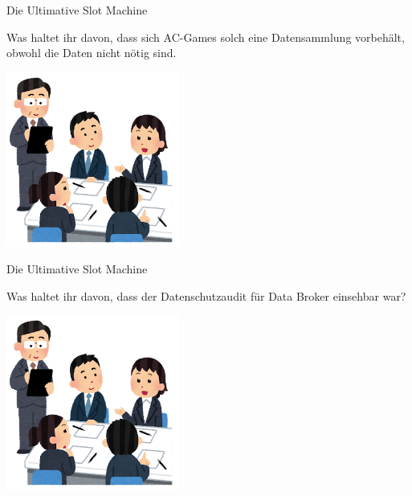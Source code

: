 \begin{frame}{Die Ultimative Slot Machine}
	\centering


	\Large
    Was haltet ihr davon, dass sich AC-Games solch eine Datensammlung vorbehält, obwohl die Daten nicht nötig sind.

	\includegraphics[width=0.425\textwidth]{images/discussion.png}
\end{frame}



\begin{frame}{Die Ultimative Slot Machine}
	\centering


	\Large
	Was haltet ihr davon, dass der Datenschutzaudit für Data Broker einsehbar war?

	\includegraphics[width=0.425\textwidth]{images/discussion.png}
\end{frame}
